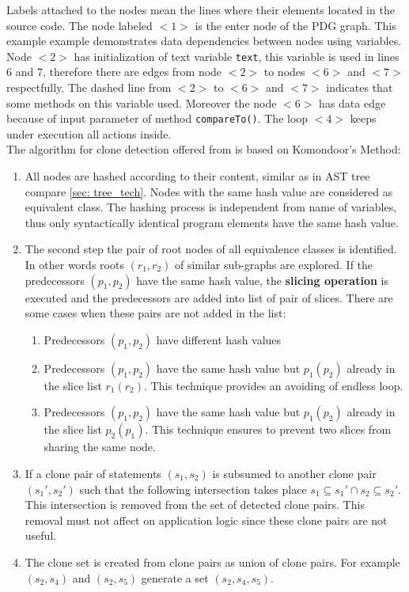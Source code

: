 \documentclass{report}
\begin{document}
Labels attached to the nodes mean the lines where their elements located in the source code. The node labeled $<1>$ is the enter node of the PDG graph. This example example demonstrates data dependencies between nodes using variables. Node $<2>$ has initialization of text variable \texttt{text}, this variable is used in lines 6 and 7, therefore there are edges from node $<2>$ to nodes $<6>$ and $<7>$ respectfully. The dashed line from $<2>$ to $<6>$ and $<7>$ indicates that some methods on this variable used. Moreover the node $<6>$ has data edge because of input parameter of method \texttt{compareTo()}. The loop $<4>$ keeps under execution all actions inside.\\
The algorithm for clone detection offered from \cite{pdg} is based on Komondoor's Method\cite{Komondoor}:
\begin{enumerate}
  \item All nodes are hashed according to their content, similar as in AST tree compare \ref{sec: tree_tech}. Nodes with the same hash value are considered as equivalent class. The hashing process is independent from name of variables, thus only syntactically identical program elements have the same hash value. 
  \item The second step the pair of root nodes of all equivalence classes is identified. In other words roots $(r_{1}, r_{2})$ of similar sub-graphs are explored. If the predecessors $(p_{1}, p_{2})$ have the same hash value, the \textbf{slicing operation} is executed and the predecessors are added into list of pair of slices. 
  There are some cases when these pairs are not added in the list:
  \begin{enumerate}
	  \item Predecessors $(p_{1}, p_{2})$ have different hash values
	  \item Predecessors $(p_{1}, p_{2})$ have the same hash value but $p_{1}(p_{2})$ already in the slice list $r_{1}(r_{2})$. This technique provides an avoiding of endless loop.
	  \item Predecessors $(p_{1}, p_{2})$ have the same hash value but $p_{1}(p_{2})$ already in the slice list $p_{2}(p_{1})$. This technique ensures to prevent two slices from sharing the same node.
	\end{enumerate}
	\item If a clone pair of statements $(s_{1}, s_{2})$ is subsumed to another clone pair $(s_{1}', s_{2}')$ such that the following intersection takes place $s_{1} \subseteq s_{1}' \cap s_{2} \subseteq s_{2}'$. This intersection  is removed from the set of detected clone pairs. This removal must not affect on application logic since these clone pairs are not useful.
	\item The clone set is created from clone pairs as union of clone pairs. For example $(s_{2}, s_{4})$ and $(s_{2}, s_{5})$ generate a set $(s_{2}, s_{4}, s_{5})$.
\end{enumerate}
\end{document}
